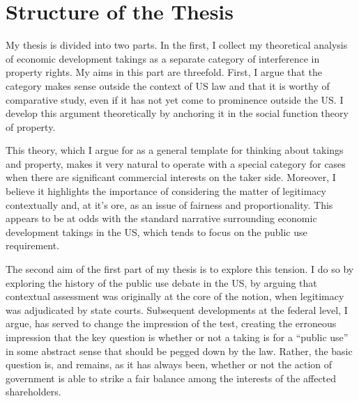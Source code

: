 
\section{Structure of the Thesis}

My thesis is divided into two parts. In the first, I collect my theoretical analysis of economic development takings as a separate category of interference in property rights. My aims in this part are threefold. First, I argue that the category makes sense outside the context of US law and that it is worthy of comparative study, even if it has not yet come to prominence outside the US. I develop this argument theoretically by anchoring it in the social function theory of property. 

This theory, which I argue for as a general template for thinking about takings and property, makes it very natural to operate with a special category for cases when there are significant commercial interests on the taker side. Moreover, I believe it highlights the importance of considering the matter of legitimacy contextually and, at it's ore, as an issue of fairness and proportionality. This appears to be at odds with the standard narrative surrounding economic development takings in the US, which tends to focus on the public use requirement.

The second aim of the first part of my thesis is to explore this tension. I do so by exploring the history of the public use debate in the US, by arguing that contextual assessment was originally at the core of the notion, when legitimacy was adjudicated by state courts. Subsequent developments at the federal level, I argue, has served to change the impression of the test, creating the erroneous impression that the key question is whether or not a taking is for a ``public use'' in some abstract sense that should be pegged down by the law. Rather, the basic question is, and remains, as it has always been, whether or not the action of government is able to strike a fair balance among the interests of the affected shareholders.

